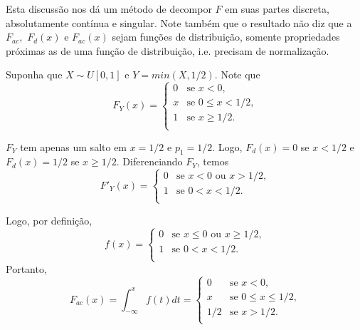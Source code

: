 %
\begin{frame}
Esta discussão nos dá um método de decompor $F$ em suas partes discreta, absolutamente contínua e singular.	Note também que o resultado não diz que a $F_{ac},$ $F_d(x)$ e $F_{ac}(x)$ sejam funções de distribuição, somente propriedades próximas as de uma função de distribuição, i.e. precisam de normalização.
\begin{exem}

Suponha que $X\sim U[0,1]$ e $Y=min(X,1/2)$. Note que
\[
F_Y(x)= \left\{
\begin{array}{ll}
0 & \mbox{se $x<0$,} \\
x & \mbox{se $0\leq x<1/2$,} \\
1 & \mbox{se $x\geq 1/2$.}\\
\end{array}
\right.
\]

$F_Y$ tem apenas um salto em $x=1/2$ e $p_1=1/2$. Logo, $F_d(x)=0$ se $x<1/2$ e $F_d(x)=1/2$ se $x\geq 1/2$. Diferenciando $F_Y$, temos
\[
F'_Y(x)= \left\{
\begin{array}{ll}
0 & \mbox{se $x<0$ ou $x>1/2$,} \\
1 & \mbox{se $0<x< 1/2$.}\\
\end{array}
\right.
\]


Logo, por definição,
\[
f(x)= \left\{
\begin{array}{ll}
0 & \mbox{se $x\leq 0$ ou $x\geq 1/2$,} \\
1 & \mbox{se $0<x< 1/2$.}\\
\end{array}
\right.
\]
Portanto,
\[
F_{ac}(x)= \int_{-\infty}^{x}f(t)dt=\left\{
\begin{array}{ll}
0 & \mbox{se $x< 0$,} \\
x & \mbox{se $0\leq x\leq 1/2$,} \\
1/2 & \mbox{se $x> 1/2$.}\\
\end{array}
\right.
\]

\end{exem}
\end{frame}

